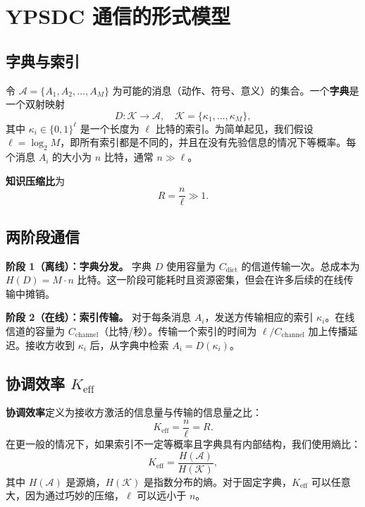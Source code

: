 \documentclass[12pt,a4paper]{article}
\theoremstyle{remark}
\newcommand{\Keff}{K_{\mathrm{eff}}}
\begin{document}
	\section{YPSDC 通信的形式模型}
	\label{sec:model}
	
	\subsection{字典与索引}
	
	令 $\mathcal{A} = \{A_1, A_2, \dots, A_M\}$ 为可能的消息（动作、符号、意义）的集合。一个\textbf{字典}是一个双射映射
	\begin{equation}
		D: \mathcal{K} \to \mathcal{A}, \quad \mathcal{K} = \{\kappa_1, \dots, \kappa_M\},
	\end{equation}
	其中 $\kappa_i \in \{0,1\}^\ell$ 是一个长度为 $\ell$ 比特的索引。为简单起见，我们假设 $\ell = \log_2 M$，即所有索引都是不同的，并且在没有先验信息的情况下等概率。每个消息 $A_i$ 的大小为 $n$ 比特，通常 $n \gg \ell$。
	
	\textbf{知识压缩比}为
	\begin{equation}
		R = \frac{n}{\ell} \gg 1.
	\end{equation}
	
	\subsection{两阶段通信}
	
	\textbf{阶段 1（离线）：字典分发。} 字典 $D$ 使用容量为 $C_{\text{dict}}$ 的信道传输一次。总成本为 $H(D) = M \cdot n$ 比特。这一阶段可能耗时且资源密集，但会在许多后续的在线传输中摊销。
	
	\textbf{阶段 2（在线）：索引传输。} 对于每条消息 $A_i$，发送方传输相应的索引 $\kappa_i$。在线信道的容量为 $C_{\text{channel}}$（比特/秒）。传输一个索引的时间为 $\ell / C_{\text{channel}}$ 加上传播延迟。接收方收到 $\kappa_i$ 后，从字典中检索 $A_i = D(\kappa_i)$。
	
	\subsection{协调效率 $\Keff$}
	\label{sec:keff-def}
	
	\textbf{协调效率}定义为接收方激活的信息量与传输的信息量之比：
	\begin{equation}
		\Keff = \frac{n}{\ell} = R. \label{eq:keff-def}
	\end{equation}
	在更一般的情况下，如果索引不一定等概率且字典具有内部结构，我们使用熵比：
	\begin{equation}
		\Keff = \frac{H(\mathcal{A})}{H(\mathcal{K})},
	\end{equation}
	其中 $H(\mathcal{A})$ 是源熵，$H(\mathcal{K})$ 是指数分布的熵。对于固定字典，$\Keff$ 可以任意大，因为通过巧妙的压缩，$\ell$ 可以远小于 $n$。
	
\end{document}

